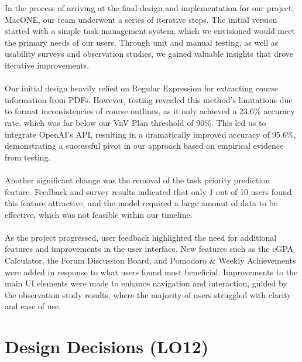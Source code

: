 \documentclass{article}
\begin{document}
In the process of arriving at the final design and implementation for our project, MacONE, our team underwent a series of iterative steps. The initial version started with a simple task management system, which we envisioned would meet the primary needs of our users. Through unit and manual testing, as well as usability surveys and observation studies, we gained valuable insights that drove iterative improvements. \\
\\
Our initial design heavily relied on Regular Expression for extracting course information from PDFs. However, testing revealed this method's limitations due to format inconsistencies of course outlines, as it only achieved a 23.6\% accuracy rate, which was far below our VnV Plan threshold of 90\%. This led us to integrate OpenAI's API, resulting in a dramatically improved accuracy of 95.6\%, demonstrating a successful pivot in our approach based on empirical evidence from testing.\\
\\
Another significant change was the removal of the task priority prediction feature. Feedback and survey results indicated that only 1 out of 10 users found this feature attractive, and the model required a large amount of data to be effective, which was not feasible within our timeline.\\
\\
As the project progressed, user feedback highlighted the need for additional features and improvements in the user interface. New features such as the cGPA Calculator, the Forum Discussion Board, and Pomodoro & Weekly Achievements were added in response to what users found most beneficial. Improvements to the main UI elements were made to enhance navigation and interaction, guided by the observation study results, where the majority of users struggled with clarity and ease of use.

\section{Design Decisions (LO12)}
\end{document}
